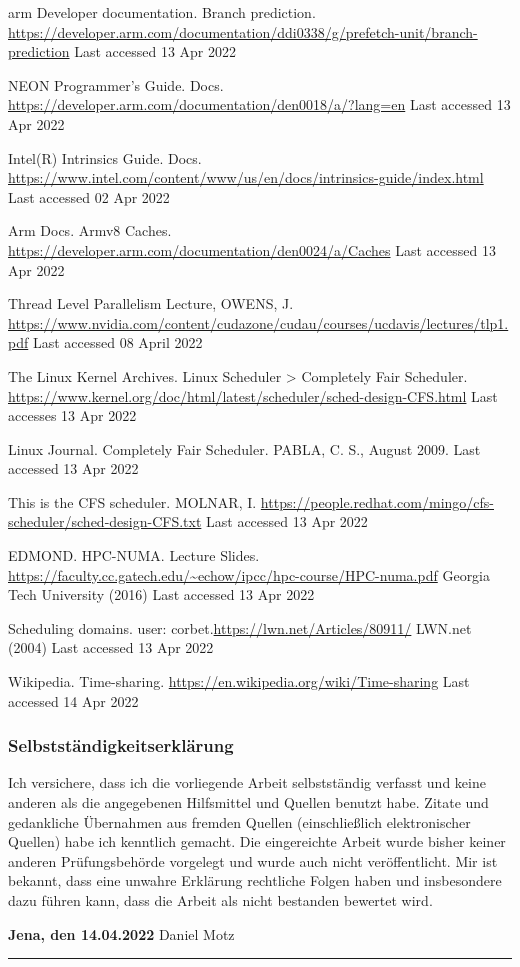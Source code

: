 \documentclass[runningheads]{llncs}
\begin{document}
\begin{thebibliography}{8}
arm Developer documentation. Branch prediction. \url{https://developer.arm.com/documentation/ddi0338/g/prefetch-unit/branch-prediction}
Last accessed 13 Apr 2022

NEON Programmer's Guide. Docs. \url{https://developer.arm.com/documentation/den0018/a/?lang=en}
Last accessed 13 Apr 2022

Intel(R) Intrinsics Guide. Docs. \url{https://www.intel.com/content/www/us/en/docs/intrinsics-guide/index.html}
Last accessed 02 Apr 2022

Arm Docs. Armv8 Caches. \url{https://developer.arm.com/documentation/den0024/a/Caches}
Last accessed 13 Apr 2022

Thread Level Parallelism Lecture, OWENS, J. \url{https://www.nvidia.com/content/cudazone/cudau/courses/ucdavis/lectures/tlp1.pdf}
Last accessed 08 April 2022

The Linux Kernel Archives. Linux Scheduler > Completely Fair Scheduler. \url{https://www.kernel.org/doc/html/latest/scheduler/sched-design-CFS.html}
Last accesses 13 Apr 2022

Linux Journal. Completely Fair Scheduler. PABLA, C. S., August 2009.
Last accessed 13 Apr 2022

This is the CFS scheduler. MOLNAR, I. \url{https://people.redhat.com/mingo/cfs-scheduler/sched-design-CFS.txt}
Last accessed 13 Apr 2022

EDMOND. HPC-NUMA. Lecture Slides. \url{https://faculty.cc.gatech.edu/~echow/ipcc/hpc-course/HPC-numa.pdf}
Georgia Tech University (2016)
Last accessed 13 Apr 2022

Scheduling domains. user: corbet.\url{https://lwn.net/Articles/80911/}
LWN.net (2004)
Last accessed 13 Apr 2022

Wikipedia. Time-sharing. \url{https://en.wikipedia.org/wiki/Time-sharing}
Last accessed 14 Apr 2022

\end{thebibliography}

\newpage

\subsubsection{Selbstständigkeitserklärung}
\noindent Ich versichere, dass ich die vorliegende Arbeit selbstständig verfasst und keine anderen 
als die angegebenen Hilfsmittel und Quellen benutzt habe. Zitate und gedankliche Übernahmen 
aus fremden Quellen (einschließlich elektronischer Quellen) habe ich kenntlich gemacht. 
Die eingereichte Arbeit wurde bisher keiner anderen Prüfungsbehörde vorgelegt und wurde auch
nicht veröffentlicht. Mir ist bekannt, dass eine unwahre Erklärung rechtliche Folgen haben 
und insbesondere dazu führen kann, dass die Arbeit als nicht bestanden bewertet wird.

\vspace{10mm}

\noindent
\textbf{Jena, den 14.04.2022}
\hfill
Daniel Motz

\par\noindent\rule{\textwidth}{0.4pt}
\end{document}
